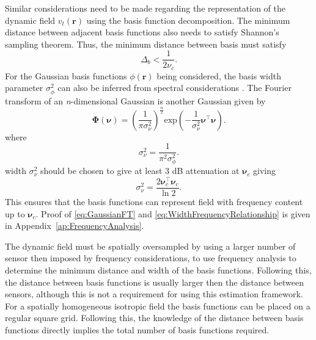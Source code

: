 \documentclass[twocolumn,11pt,a4paper]{article}		%
\begin{document}
Similar considerations need to be made regarding the representation of the dynamic field $v_t(\mathbf{r})$ using the basis function decomposition. The minimum distance between adjacent basis functions also needs to satisfy Shannon's sampling theorem. Thus, the minimum distance between basis must satisfy 
\begin{equation}
	\Delta_b < \frac{1}{2\nu_c}. 
\end{equation}
For the Gaussian basis functions $\phi(\mathbf{r})$ being considered, the basis width parameter $\sigma_{\phi}^2$ can also be inferred from spectral considerations \cite{Sanner1992,Scerri2009}. The Fourier transform of an \textit{n}-dimensional Gaussian is another Gaussian given by
\begin{equation}\label{eq:GaussianFT}
\boldsymbol\Phi(\boldsymbol \nu)=\left(\frac{1}{\pi\sigma_{\nu}^2}\right)^{\frac{n}{2}}\mathrm{exp}\left(-\frac{1}{\sigma_{\nu}^2}\boldsymbol\nu^\top \boldsymbol\nu\right).
\end{equation}
where 
\begin{equation}\label{eq:GaussianFTWidth}
	\sigma^2_{\nu} = \frac{1}{\pi^2\sigma_{\phi}^2}. 
\end{equation}
width $\sigma^2_{\nu}$ should be chosen to give at least 3 dB attenuation at $\boldsymbol\nu_c$ giving
\begin{equation}\label{eq:WidthFrequencyRelationship}
 \sigma^2_{\nu}=\frac{2\boldsymbol\nu_c^\top \boldsymbol\nu_c}{\ln 2}.
\end{equation}
This ensures that the basis functions can represent field with frequency content up to $\boldsymbol\nu_c $. Proof of \ref{eq:GaussianFT} and \ref{eq:WidthFrequencyRelationship} is given in Appendix~\ref{ap:FrequencyAnalysis}.

The dynamic field must be spatially oversampled by using a larger number of sensor then imposed by frequency considerations, to use frequency analysis to determine the minimum distance and width of the basis functions. Following this, the distance between basis functions is usually larger then the distance between sensors, although this is not a requirement for using this estimation framework. For a spatially homogeneous isotropic field the basis functions can be placed on a regular square grid. Following this, the knowledge of the distance between basis functions directly implies the total number of basis functions required.
\end{document}
